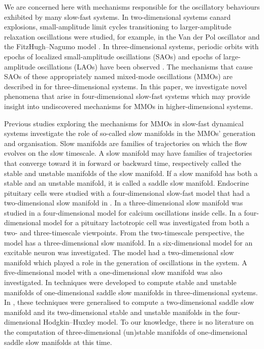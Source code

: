 \documentclass{ws-ijbc}
\begin{document}
We are concerned here with mechanisms responsible for the oscillatory behaviours exhibited by many slow-fast systems.  In two-dimensional systems canard explosions, small-amplitude limit cycles transitioning to larger-amplitude relaxation oscillations were studied, for example, in the Van der Pol oscillator and the FitzHugh--Nagumo model \cite{canard_explosion, fitz-hugh-nagumo}.  In three-dimensional systems, periodic orbits with epochs of localized small-amplitude oscillations (SAOs) and epochs of large-amplitude oscillations (LAOs) have been observed \cite{BZ}.  The mechanisms that cause SAOs of these appropriately named mixed-mode oscillations (MMOs) are described in \cite{MMO} for three-dimensional systems.  In this paper, we investigate novel phenomena that arise in four-dimensional slow-fast systems which may provide insight into undiscovered mechanisms for MMOs in higher-dimensional systems.

Previous studies exploring the mechanisms for MMOs in slow-fast dynamical systems investigate the role of so-called slow manifolds in the MMOs' generation and organisation.  Slow manifolds are families of trajectories on which the flow evolves on the slow timescale.  A slow manifold may have families of trajectories that converge toward it in forward or backward time, respectively called the stable and unstable manifolds of the slow manifold.  If a slow manifold has both a stable and an unstable manifold, it is called a saddle slow manifold.  Endocrine pituitary cells were studied with a four-dimensional slow-fast model that had a two-dimensional slow manifold in \cite{Vo_paper2}.  In \cite{Emily_Harvey_paper} a three-dimensional slow manifold was studied in a four-dimensional model for calcium oscillations inside cells. In \cite{Vo_paper} a four-dimensional model for a pituitary lactotropic cell was investigated from both a two- and three-timescale viewpoints.  From the two-timescale perspective, the model has a three-dimensional slow manifold.  In \cite{Martin_neuron_paper} a six-dimensional model for an excitable neuron was investigated.  The model had a two-dimensional slow manifold which played a role in the generation of oscillations in the system.  A five-dimensional model with a one-dimensional slow manifold was also investigated.  In \cite{Saeed_Paper} techniques were developed to compute stable and unstable manifolds of one-dimensional saddle slow manifolds in three-dimensional systems. In \cite{Cris_paper}, these techniques were generalised to compute a two-dimensional saddle slow manifold and its two-dimensional stable and unstable manifolds in the four-dimensional Hodgkin--Huxley model.  To our knowledge, there is no literature on the computation of three-dimensional (un)stable manifolds of one-dimensional saddle slow manifolds at this time.
\end{document}
